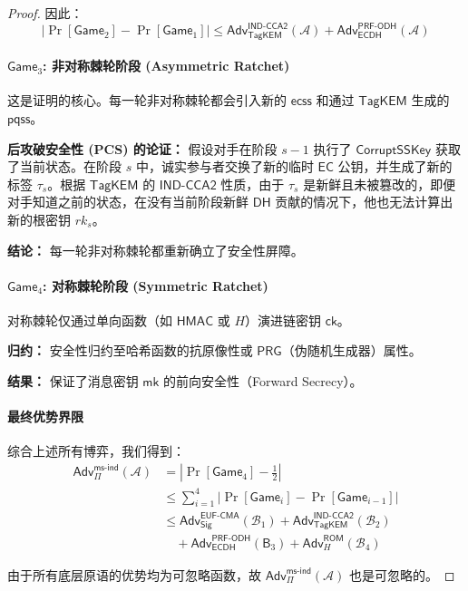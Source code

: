 \begin{proof}
因此：
\begin{equation}
    \left| \Pr[\mathsf{Game}_2] - \Pr[\mathsf{Game}_1] \right| \leq \mathsf{Adv}_{\mathsf{TagKEM}}^{\mathsf{IND\text{-}CCA2}}(\mathcal{A}) + \mathsf{Adv}_{\mathsf{ECDH}}^{\mathsf{PRF\text{-}ODH}}(\mathcal{A})
\end{equation}

\paragraph{$\mathsf{Game}_3$: 非对称棘轮阶段 (Asymmetric Ratchet)}
这是证明的核心。每一轮非对称棘轮都会引入新的 $\mathsf{ecss}$ 和通过 $\mathsf{TagKEM}$ 生成的 $\mathsf{pqss}$。

\textbf{后攻破安全性 (PCS) 的论证：} 假设对手在阶段 $s-1$ 执行了 $\mathsf{CorruptSSKey}$ 获取了当前状态。在阶段 $s$ 中，诚实参与者交换了新的临时 $\mathsf{EC}$ 公钥，并生成了新的标签 $\tau_s$。根据 $\mathsf{TagKEM}$ 的 $\mathsf{IND\text{-}CCA2}$ 性质，由于 $\tau_s$ 是新鲜且未被篡改的，即便对手知道之前的状态，在没有当前阶段新鲜 $\mathsf{DH}$ 贡献的情况下，他也无法计算出新的根密钥 $rk_s$。

\textbf{结论：} 每一轮非对称棘轮都重新确立了安全性屏障。

\paragraph{$\mathsf{Game}_4$: 对称棘轮阶段 (Symmetric Ratchet)}
对称棘轮仅通过单向函数（如 $\mathsf{HMAC}$ 或 $H$）演进链密钥 $\mathsf{ck}$。

\textbf{归约：} 安全性归约至哈希函数的抗原像性或 $\mathsf{PRG}$（伪随机生成器）属性。

\textbf{结果：} 保证了消息密钥 $\mathsf{mk}$ 的前向安全性（Forward Secrecy）。

\paragraph{最终优势界限}
综合上述所有博弈，我们得到：
\begin{align}
    \mathsf{Adv}_{\Pi}^{\mathsf{ms\text{-}ind}}(\mathcal{A}) &= \left| \Pr[\mathsf{Game}_4] - \frac{1}{2} \right| \nonumber \\
    &\leq \sum_{i=1}^{4} \left| \Pr[\mathsf{Game}_i] - \Pr[\mathsf{Game}_{i-1}] \right| \nonumber \\
    &\leq \mathsf{Adv}_{\mathsf{Sig}}^{\mathsf{EUF\text{-}CMA}}(\mathcal{B}_1) + \mathsf{Adv}_{\mathsf{TagKEM}}^{\mathsf{IND\text{-}CCA2}}(\mathcal{B}_2) \nonumber \\
    &\quad + \mathsf{Adv}_{\mathsf{ECDH}}^{\mathsf{PRF\text{-}ODH}}(\mathsf{B}_3) + \mathsf{Adv}_{H}^{\mathsf{ROM}}(\mathcal{B}_4)
\end{align}

由于所有底层原语的优势均为可忽略函数，故 $\mathsf{Adv}_{\Pi}^{\mathsf{ms\text{-}ind}}(\mathcal{A})$ 也是可忽略的。
\end{proof}